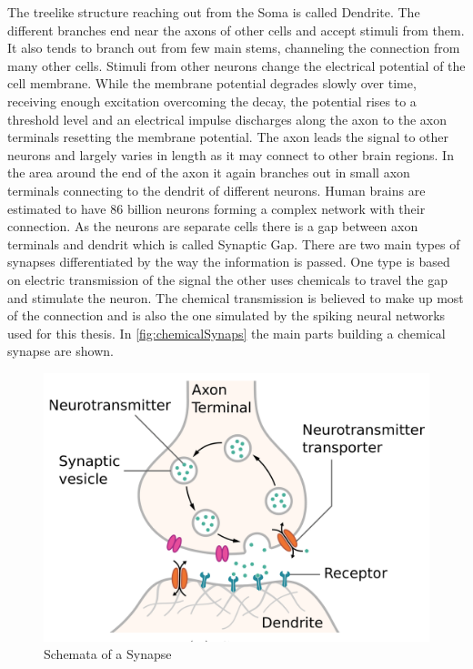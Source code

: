 The treelike structure reaching out from the Soma is called Dendrite. The different branches end near the axons of other cells and accept stimuli from them. It also tends to branch out from few main stems, channeling the connection from many other cells. Stimuli from other neurons change the electrical potential of the cell membrane. While the membrane potential degrades slowly over time, receiving enough excitation overcoming the decay, the potential rises to a threshold level and an electrical impulse discharges along the axon to the axon terminals resetting the membrane potential. The axon leads the signal to other neurons and largely varies in length as it may connect to other brain regions. In the area around the end of the axon it again branches out in small axon terminals connecting to the dendrit of different neurons. Human brains are estimated to have 86 billion neurons forming a complex network with their connection.
\newline
As the neurons are separate cells there is a gap between axon terminals and dendrit which is called Synaptic Gap. There are two main types of synapses differentiated by the way the information is passed. One type is based on electric transmission of the signal the other uses chemicals to travel the gap and stimulate the neuron. The chemical transmission is believed to make up most of the connection and is also the one simulated by the spiking neural networks used for this thesis. In \autoref{fig:chemicalSynaps} the main parts building a chemical synapse are shown.
\begin{figure}[htpb]
  \centering
  \includegraphics[scale=0.25]{figures/synapse.png}
  \caption{Schemata of a Synapse \cite{wikiSyn}}
  \label{fig:chemicalSynaps}
\end{figure}
